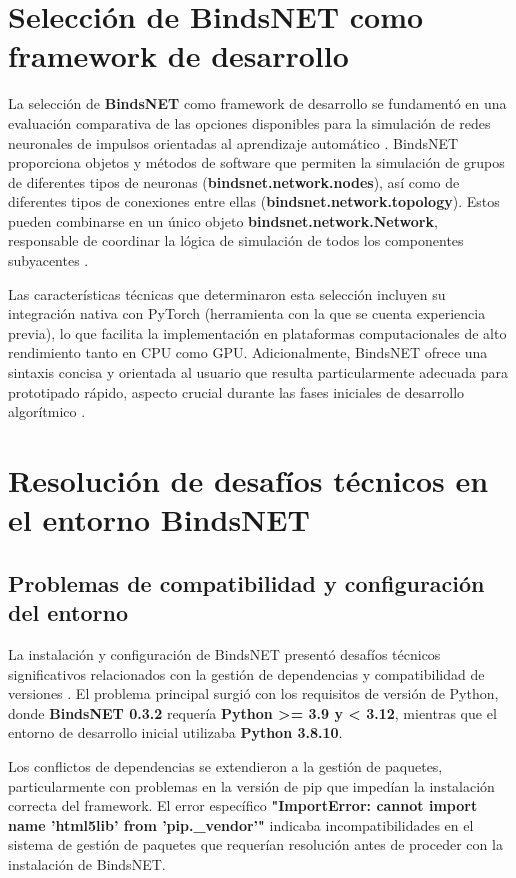 \section{Selección de BindsNET como framework de desarrollo}

La selección de \textbf{BindsNET} como framework de desarrollo se fundamentó en una evaluación comparativa de las opciones disponibles para la simulación de redes neuronales de impulsos orientadas al aprendizaje automático \cite{Hazan2018_BindsNET}. BindsNET proporciona objetos y métodos de software que permiten la simulación de grupos de diferentes tipos de neuronas (\textbf{bindsnet.network.nodes}), así como de diferentes tipos de conexiones entre ellas (\textbf{bindsnet.network.topology}). Estos pueden combinarse en un único objeto \textbf{bindsnet.network.Network}, responsable de coordinar la lógica de simulación de todos los componentes subyacentes \cite{bindsnet_docs}.

Las características técnicas que determinaron esta selección incluyen su integración nativa con PyTorch (herramienta con la que se cuenta experiencia previa), lo que facilita la implementación en plataformas computacionales de alto rendimiento tanto en CPU como GPU. Adicionalmente, BindsNET ofrece una sintaxis concisa y orientada al usuario que resulta particularmente adecuada para prototipado rápido, aspecto crucial durante las fases iniciales de desarrollo algorítmico \cite{bindsnet_docs}.

\section{Resolución de desafíos técnicos en el entorno BindsNET}
\subsection{Problemas de compatibilidad y configuración del entorno}

La instalación y configuración de BindsNET presentó desafíos técnicos significativos relacionados con la gestión de dependencias y compatibilidad de versiones . El problema principal surgió con los requisitos de versión de Python, donde \textbf{BindsNET 0.3.2} requería \textbf{Python >= 3.9 y < 3.12}, mientras que el entorno de desarrollo inicial utilizaba \textbf{Python 3.8.10}.

Los conflictos de dependencias se extendieron a la gestión de paquetes, particularmente con problemas en la versión de pip que impedían la instalación correcta del framework. El error específico \textbf{"ImportError: cannot import name 'html5lib' from 'pip.\_vendor'"} indicaba incompatibilidades en el sistema de gestión de paquetes que requerían resolución antes de proceder con la instalación de BindsNET.

